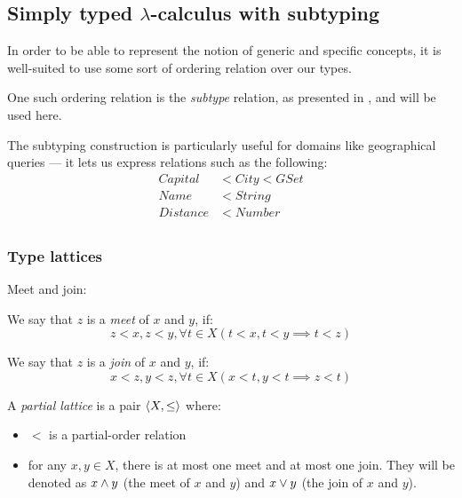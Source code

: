 \documentclass[main.tex]{subfiles}
\begin{document}
\subsection{Simply typed $\lambda$-calculus with subtyping}
\label{sec:lambda}

In order to be able to represent the notion of generic and specific concepts,
it is well-suited to use some sort of ordering relation over our types.

One such ordering relation is the \emph{subtype} relation, as presented in
\cite[chap.~15]{pierce}, and will be used here.

\begin{example}
    The subtyping construction is particularly useful for domains like
    geographical queries --- it lets us express relations such as the following:
    \begin{align*}
        Capital & \less City \less GSet \\
        Name & \less String \\
        Distance & \less Number \\
    \end{align*}
\end{example}

\subsubsection{Type lattices}
\begin{defn}
    Meet and join:

    We say that $z$ is a \emph{meet} of $x$ and $y$, if:
    \begin{equation}
        z \less x, z \less y,
            \forall t \in X (t \less x, t \less y \implies t \less z)
    \end{equation}

    We say that $z$ is a \emph{join} of $x$ and $y$, if:
    \begin{equation}
        x \less z, y \less z,
            \forall t \in X (x \less t, y \less t \implies z \less t)
    \end{equation}
\end{defn}

\begin{defn}
    A \emph{partial lattice} is a pair $\langle  X,  \leq  \rangle$ where:
    \begin{itemize}
        \item $\less$ is a partial-order relation
        \item for any $x, y \in X$, there is at most one meet and at most one join.
            They will be denoted as $x \wedge y$ (the meet of $x$ and $y$) and
            $x \vee y$ (the join of $x$ and $y$).
    \end{itemize}
\end{defn}
\end{document}
